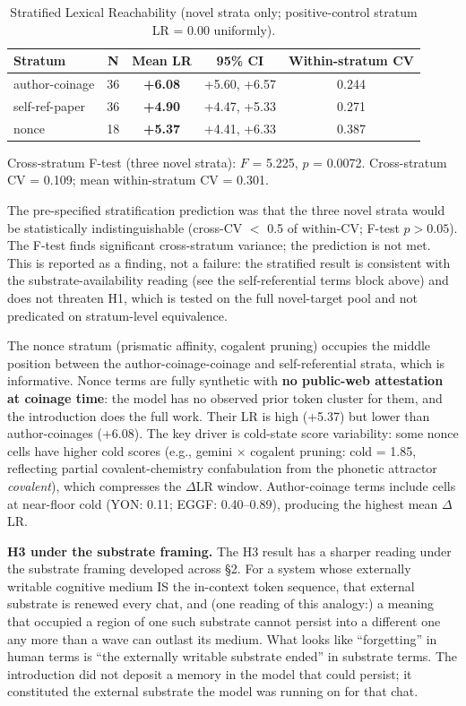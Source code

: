 \documentclass[11pt,a4paper]{article}
\begin{document}
\begin{table}[t]
  \centering
  \footnotesize
  \begin{tabular}{lcccc}
    \toprule
    \textbf{Stratum} & \textbf{N} & \textbf{Mean LR} & \textbf{95\% CI} & \textbf{Within-stratum CV} \\
    \midrule
    author-coinage   & 36 & \textbf{+6.08} & +5.60, +6.57 & 0.244 \\
    self-ref-paper & 36 & \textbf{+4.90} & +4.47, +5.33 & 0.271 \\
    nonce          & 18 & \textbf{+5.37} & +4.41, +6.33 & 0.387 \\
    \bottomrule
  \end{tabular}
  \caption{Stratified Lexical Reachability (novel strata only; positive-control stratum LR = 0.00 uniformly).}
  \label{tab:stratified-lr}
\end{table}

Cross-stratum F-test (three novel strata): $F$ = 5.225, $p$ = 0.0072. Cross-stratum CV = 0.109; mean within-stratum CV = 0.301.

The pre-specified stratification prediction was that the three novel strata would be statistically indistinguishable (cross-CV $<$ 0.5 of within-CV; F-test $p > 0.05$). The F-test finds significant cross-stratum variance; the prediction is not met. This is reported as a finding, not a failure: the stratified result is consistent with the substrate-availability reading (see the self-referential terms block above) and does not threaten H1, which is tested on the full novel-target pool and not predicated on stratum-level equivalence.

The nonce stratum (prismatic affinity, cogalent pruning) occupies the middle position between the author-coinage-coinage and self-referential strata, which is informative. Nonce terms are fully synthetic with \textbf{no public-web attestation at coinage time}: the model has no observed prior token cluster for them, and the introduction does the full work. Their LR is high (+5.37) but lower than author-coinages (+6.08). The key driver is cold-state score variability: some nonce cells have higher cold scores (e.g., gemini $\times$ cogalent pruning: cold = 1.85, reflecting partial covalent-chemistry confabulation from the phonetic attractor \textit{covalent}), which compresses the $\Delta$LR window. Author-coinage terms include cells at near-floor cold (YON: 0.11; EGGF: 0.40--0.89), producing the highest mean $\Delta$LR.

\textbf{H3 under the substrate framing.} The H3 result has a sharper reading under the substrate framing developed across \S2. For a system whose externally writable cognitive medium IS the in-context token sequence, that external substrate is renewed every chat, and (one reading of this analogy:) a meaning that occupied a region of one such substrate cannot persist into a different one any more than a wave can outlast its medium. What looks like ``forgetting'' in human terms is ``the externally writable substrate ended'' in substrate terms. The introduction did not deposit a memory in the model that could persist; it constituted the external substrate the model was running on for that chat.
\end{document}
